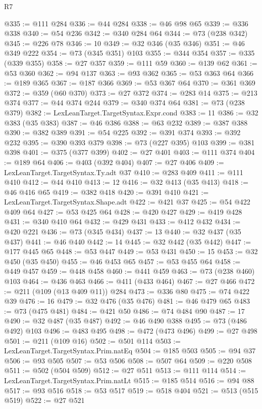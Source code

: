 \begin{lexlean}{R7}
\begin{coremodule}
@335 := @111 @284
@336 := @44 @284
@338 := @46 @98 @65
@339 := @336 @338
@340 := @54 @236
@342 := @340 @284 @64
@344 := @73 (@238 @342)
@345 := @226 @78
@346 := 10
@349 := @32 @346 (@35 @346)
@351 := @46 @349 @222
@354 := @73 (@345 @351) @103
@355 := @344 @354
@357 := @335 (@339 @355)
@358 := @27 @357
@359 := @111 @59
@360 := @139 @62
@361 := @53 @360
@362 := @94 @137
@363 := @93 @362
@365 := @53 @363 @64
@366 := @189 @365
@367 := @187 @366
@369 := @53 @367 @64
@370 := @361 @369
@372 := @359 (@60 @370)
@373 := @27 @372
@374 := @283 @14
@375 := @213 @374
@377 := @44 @374 @244
@379 := @340 @374 @64
@381 := @73 (@238 @379)
@382 := LexLeanTarget.TargetSyntax.Expr.cond
@383 := 11
@386 := @32 @383 (@35 @383)
@387 := @46 @386
@388 := @63 @232
@389 := @387 @388
@390 := @382 @389
@391 := @54 @225
@392 := @391 @374
@393 := @392 @232
@395 := @390 @393 @379
@398 := @73 (@227 @395) @103
@399 := @381 @398
@401 := @375 (@377 @399)
@402 := @27 @401
@403 := @111 @374
@404 := @189 @64
@406 := @403 (@392 @404)
@407 := @27 @406
@409 := LexLeanTarget.TargetSyntax.Ty.adt @37
@410 := @283 @409
@411 := @111 @410
@412 := @44 @410
@413 := 12
@416 := @32 @413 (@35 @413)
@418 := @46 @416 @65
@419 := @382 @418
@420 := @391 @410
@421 := LexLeanTarget.TargetSyntax.Shape.adt
@422 := @421 @37
@425 := @54 @422 @409 @64
@427 := @53 @425 @64
@428 := @420 @427
@429 := @419 @428
@431 := @340 @410 @64
@432 := @429 @431
@433 := @412 @432
@434 := @420 @221
@436 := @73 (@345 @434)
@437 := 13
@440 := @32 @437 (@35 @437)
@441 := @46 @440
@442 := 14
@445 := @32 @442 (@35 @442)
@447 := @177 @445 @65
@448 := @53 @447
@449 := @53 @431
@450 := 15
@453 := @32 @450 (@35 @450)
@455 := @46 @453 @65
@457 := @53 @455 @64
@458 := @449 @457
@459 := @448 @458
@460 := @441 @459
@463 := @73 (@238 @460) @103
@464 := @436 @463
@466 := @411 (@433 @464)
@467 := @27 @466
@472 := @211 (@109 (@13 @409 @11)) @284
@473 := @336 @80
@475 := @74 @422 @39
@476 := 16
@479 := @32 @476 (@35 @476)
@481 := @46 @479 @65
@483 := @73 (@475 @481)
@484 := @421 @50
@486 := @74 @484 @90
@487 := 17
@490 := @32 @487 (@35 @487)
@492 := @46 @490 @388
@495 := @73 (@486 @492) @103
@496 := @483 @495
@498 := @472 (@473 @496)
@499 := @27 @498
@501 := @211 (@109 @16)
@502 := @501 @114
@503 := LexLeanTarget.TargetSyntax.Prim.natEq
@504 := @185 @503
@505 := @94 @37
@506 := @93 @505
@507 := @53 @506
@508 := @507 @64
@509 := @220 @508
@511 := @502 (@504 @509)
@512 := @27 @511
@513 := @111 @114
@514 := LexLeanTarget.TargetSyntax.Prim.natLt
@515 := @185 @514
@516 := @94 @88
@517 := @93 @516
@518 := @53 @517
@519 := @518 @404
@521 := @513 (@515 @519)
@522 := @27 @521

\end{coremodule}
\end{lexlean}
